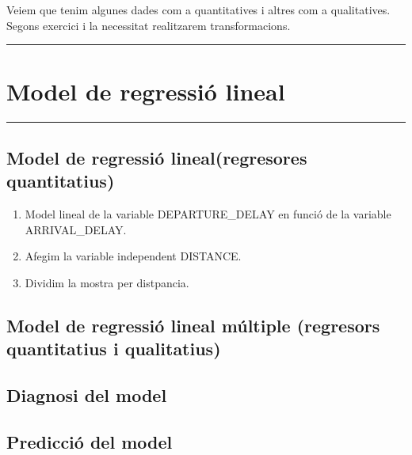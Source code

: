 \documentclass[
]{article}
\begin{document}
Veiem que tenim algunes dades com a quantitatives i altres com a
qualitatives. Segons exercici i la necessitat realitzarem
transformacions.

\begin{center}\rule{0.5\linewidth}{0.5pt}\end{center}

\hypertarget{model-de-regressiuxf3-lineal}{%
\section{Model de regressió lineal}\label{model-de-regressiuxf3-lineal}}

\begin{center}\rule{0.5\linewidth}{0.5pt}\end{center}

\hypertarget{model-de-regressiuxf3-linealregresores-quantitatius}{%
\subsection{Model de regressió lineal(regresores
quantitatius)}\label{model-de-regressiuxf3-linealregresores-quantitatius}}

\begin{enumerate}
\def\labelenumi{\alph{enumi}.}
\item
  Model lineal de la variable DEPARTURE\_DELAY en funció de la variable
  ARRIVAL\_DELAY.
\item
  Afegim la variable independent DISTANCE.
\item
  Dividim la mostra per distpancia.
\end{enumerate}

\hypertarget{model-de-regressiuxf3-lineal-muxfaltiple-regresors-quantitatius-i-qualitatius}{%
\subsection{Model de regressió lineal múltiple (regresors quantitatius i
qualitatius)}\label{model-de-regressiuxf3-lineal-muxfaltiple-regresors-quantitatius-i-qualitatius}}

\hypertarget{diagnosi-del-model}{%
\subsection{Diagnosi del model}\label{diagnosi-del-model}}

\hypertarget{predicciuxf3-del-model}{%
\subsection{Predicció del model}\label{predicciuxf3-del-model}}
\end{document}
